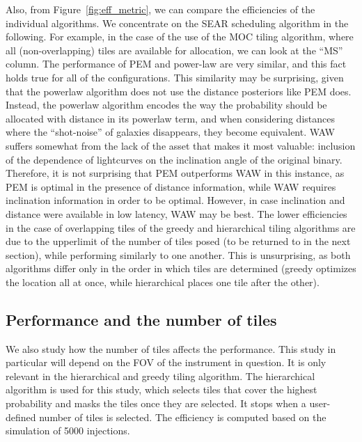 \documentclass[twocolumn]{aastex62}
\begin{document}
Also, from Figure~\ref{fig:eff_metric}, we can compare the efficiencies of the individual algorithms.
We concentrate on the SEAR scheduling algorithm in the following. For example, in the case of the use of the MOC tiling algorithm, where all (non-overlapping) tiles are available for allocation, we can look at the ``MS'' column. The performance of PEM and power-law are very similar, and this fact holds true for all of the configurations. This similarity may be surprising, given that the powerlaw algorithm does not use the distance posteriors like PEM does. Instead, the powerlaw algorithm encodes the way the probability should be allocated with distance in its powerlaw term, and when considering distances where the ``shot-noise'' of galaxies disappears, they become equivalent. WAW suffers somewhat from the lack of the asset that makes it most valuable: inclusion of the dependence of lightcurves on the inclination angle of the original binary. Therefore, it is not surprising that PEM outperforms WAW in this instance, as PEM is optimal in the presence of distance information, while WAW requires inclination information in order to be optimal. However, in case inclination and distance were available in low latency, WAW may be best.
The lower efficiencies in the case of overlapping tiles of the greedy and hierarchical tiling algorithms are due to the upperlimit of the number of tiles posed (to be returned to in the next section), while performing similarly to one another. This is unsurprising, as both algorithms differ only in the order in which tiles are determined (greedy optimizes the location all at once, while hierarchical places one tile after the other).

\subsection{Performance and the number of tiles}

We also study how the number of tiles affects the performance. This study in particular will depend on the FOV of the instrument in question. It is only relevant in the hierarchical and greedy tiling algorithm. The hierarchical algorithm is used for this study, which selects tiles that cover the highest probability and masks the tiles once they are selected. It stops when a user-defined number of tiles is selected. The efficiency is computed based on the simulation of 5000 injections.
\end{document}
